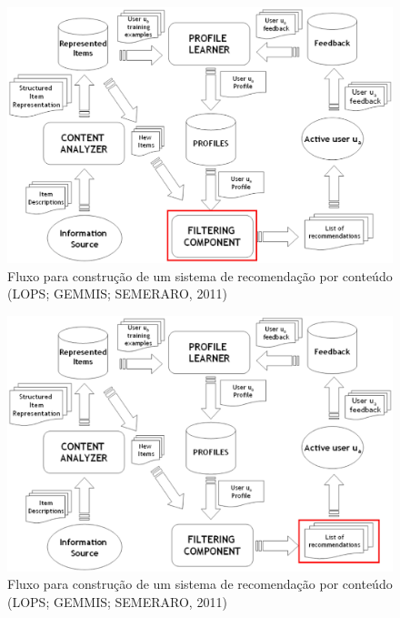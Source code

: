 \begin{frame}

\begin{figure}[h!]
  \centering
    \includegraphics[width=1\textwidth]{figura/recomendacao_conteudo_4.eps}
  \caption{Fluxo para construção de um sistema de recomendação por conteúdo (LOPS; GEMMIS; SEMERARO, 2011)}
\end{figure}

\end{frame}

\begin{frame}

\begin{figure}[h!]
  \centering
    \includegraphics[width=1\textwidth]{figura/recomendacao_conteudo_5.eps}
  \caption{Fluxo para construção de um sistema de recomendação por conteúdo (LOPS; GEMMIS; SEMERARO, 2011)}
\end{figure}

\end{frame}

